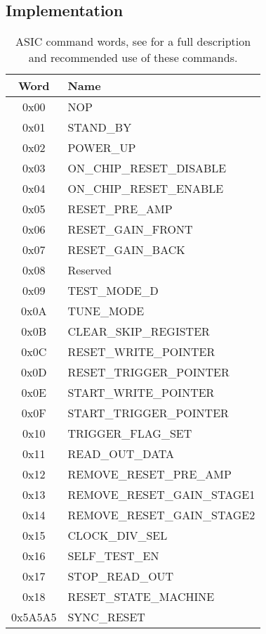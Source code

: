 \documentclass[]{article}
\begin{document}
	\subsection{Implementation} %
	\label{sub:tx_implementation}
	\begin{table}
		\begin{center}
			\setlength{\extrarowheight}{1.5pt}
			\begin{tabular}{c | l}
				Word & Name \\
				\hline	
				0x00 & NOP \\
				0x01 & STAND\_BY \\
				0x02 & POWER\_UP \\
				0x03 & ON\_CHIP\_RESET\_DISABLE \\
				0x04 & ON\_CHIP\_RESET\_ENABLE \\
				0x05 & RESET\_PRE\_AMP \\
				0x06 & RESET\_GAIN\_FRONT \\
				0x07 & RESET\_GAIN\_BACK \\
				0x08 & Reserved \\
				0x09 & TEST\_MODE\_D \\
				0x0A & TUNE\_MODE \\
				0x0B & CLEAR\_SKIP\_REGISTER \\
				0x0C & RESET\_WRITE\_POINTER \\
				0x0D & RESET\_TRIGGER\_POINTER \\
				0x0E & START\_WRITE\_POINTER \\
				0x0F & START\_TRIGGER\_POINTER \\
				0x10 & TRIGGER\_FLAG\_SET \\
				0x11 & READ\_OUT\_DATA \\
				0x12 & REMOVE\_RESET\_PRE\_AMP \\
				0x13 & REMOVE\_RESET\_GAIN\_STAGE1 \\
				0x14 & REMOVE\_RESET\_GAIN\_STAGE2 \\
				0x15 & CLOCK\_DIV\_SEL \\
				0x16 & SELF\_TEST\_EN \\
				0x17 & STOP\_READ\_OUT \\
				0x18 & RESET\_STATE\_MACHINE \\
				0x5A5A5 & SYNC\_RESET \\
			\end{tabular}
		\end{center}
		\caption{ASIC command words, see \cite{REF FOR LPD ASIC} for a full description and recommended use of these commands.}
		\label{tab:asic_command_words}
	\end{table}
\end{document}
